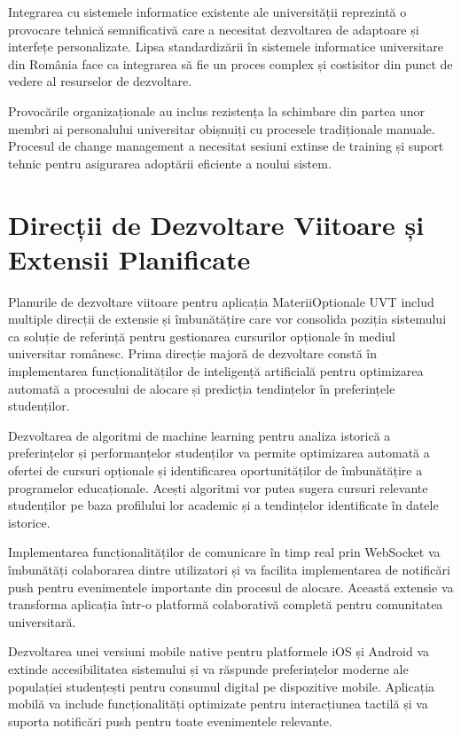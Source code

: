 \documentclass[12pt,a4paper]{report}
\begin{document}
Integrarea cu sistemele informatice existente ale universității reprezintă o provocare tehnică semnificativă care a necesitat dezvoltarea de adaptoare și interfețe personalizate. Lipsa standardizării în sistemele informatice universitare din România face ca integrarea să fie un proces complex și costisitor din punct de vedere al resurselor de dezvoltare.

Provocările organizaționale au inclus rezistența la schimbare din partea unor membri ai personalului universitar obișnuiți cu procesele tradiționale manuale. Procesul de change management a necesitat sesiuni extinse de training și suport tehnic pentru asigurarea adoptării eficiente a noului sistem.

\section{Direcții de Dezvoltare Viitoare și Extensii Planificate}

Planurile de dezvoltare viitoare pentru aplicația MateriiOptionale UVT includ multiple direcții de extensie și îmbunătățire care vor consolida poziția sistemului ca soluție de referință pentru gestionarea cursurilor opționale în mediul universitar românesc. Prima direcție majoră de dezvoltare constă în implementarea funcționalităților de inteligență artificială pentru optimizarea automată a procesului de alocare și predicția tendințelor în preferințele studenților.

Dezvoltarea de algoritmi de machine learning pentru analiza istorică a preferințelor și performanțelor studenților va permite optimizarea automată a ofertei de cursuri opționale și identificarea oportunităților de îmbunătățire a programelor educaționale. Acești algoritmi vor putea sugera cursuri relevante studenților pe baza profilului lor academic și a tendințelor identificate în datele istorice.

Implementarea funcționalităților de comunicare în timp real prin WebSocket va îmbunătăți colaborarea dintre utilizatori și va facilita implementarea de notificări push pentru evenimentele importante din procesul de alocare. Această extensie va transforma aplicația într-o platformă colaborativă completă pentru comunitatea universitară.

Dezvoltarea unei versiuni mobile native pentru platformele iOS și Android va extinde accesibilitatea sistemului și va răspunde preferințelor moderne ale populației studențești pentru consumul digital pe dispozitive mobile. Aplicația mobilă va include funcționalități optimizate pentru interacțiunea tactilă și va suporta notificări push pentru toate evenimentele relevante.
\end{document}
